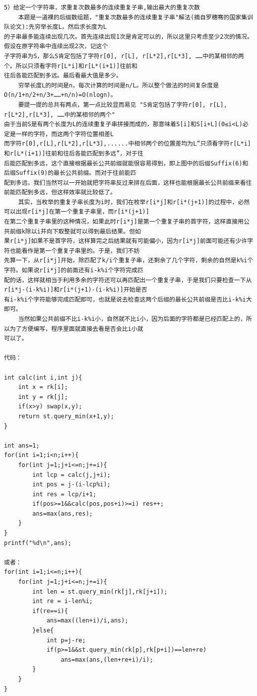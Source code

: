 \documentclass[twoside]{article}
\begin{document}
\begin{lstlisting}
5）给定一个字符串，求重复次数最多的连续重复子串,输出最大的重复次数
    本题是一道裸的后缀数组题，"重复次数最多的连续重复子串"解法(摘自罗穗骞的国家集训队论文):先穷举长度L，然后求长度为L
的子串最多能连续出现几次。首先连续出现1次是肯定可以的，所以这里只考虑至少2次的情况。假设在原字符串中连续出现2次，记这个
子字符串为S，那么S肯定包括了字符r[0], r[L], r[L*2],r[L*3], ……中的某相邻的两个。所以只须看字符r[L*i]和r[L*(i+1)]往前和
往后各能匹配到多远。最后看最大值是多少。
    穷举长度L的时间是n，每次计算的时间是n/L。所以整个做法的时间复杂度是O(n/1+n/2+n/3+……+n/n)=O(nlogn)。
    要提一提的总共有两点，第一点比较显而易见 "S肯定包括了字符r[0], r[L], r[L*2],r[L*3], ……中的某相邻的两个"
由于当前S是有两个长度为L的连续重复子串拼接而成的，那意味着S[i]和S[i+L](0≤i<L)必定是一样的字符，而这两个字符位置相差L
而字符r[0],r[L],r[L*2],r[L*3],......中相邻两个的位置差均为L“只须看字符r[L*i]和r[L*(i+1)]往前和往后各能匹配到多远”，对于往
后能匹配到多远，这个直接根据最长公共前缀就能很容易得到，即上图中的后缀Suffix(6)和后缀Suffix(9)的最长公共前缀。而对于往前能匹
配到多远，我们当然可以一开始就把字符串反过来拼在后面，这样也能根据最长公共前缀来看往前能匹配到多远，但这样效率就比较低了。
    其实，当枚举的重复子串长度为i时，我们在枚举r[i*j]和r[i*(j+1)]的过程中，必然可以出现r[i*j]在第一个重复子串里，而r[i*(j+1)]
在第二个重复子串里的这种情况，如果此时r[i*j]是第一个重复子串的首字符，这样直接用公共前缀k除以i并向下取整就可以得到最后结果。但如
果r[i*j]如果不是首字符，这样算完之后结果就有可能偏小，因为r[i*j]前面可能还有少许字符也能看作是第一个重复子串里的。于是，我们不妨
先算一下，从r[i*j]开始，除匹配了k/i个重复子串，还剩余了几个字符，剩余的自然是k%i个字符。如果说r[i*j]的前面还有i-k%i个字符完成匹
配的话，这样就相当于利用多余的字符还可以再匹配出一个重复子串，于是我们只要检查一下从r[i*j-(i-k%i)]和r[i*(j+1)-(i-k%i)]开始是否
有i-k%i个字符能够完成匹配即可，也就是说去检查这两个后缀的最长公共前缀是否比i-k%i大即可。
    当然如果公共前缀不比i-k%i小，自然就不比i小，因为后面的字符都是已经匹配上的，所以为了方便编写，程序里面就直接去看是否会比i小就
可以了。

代码：

int calc(int i,int j){
    int x = rk[i];
    int y = rk[j];
    if(x>y) swap(x,y);
    return st.query_min(x+1,y);
}

int ans=1;
for(int i=1;i<n;i++){
    for(int j=1;j+i<=n;j+=i){
        int lcp = calc(j,j+i);
        int pos = j-(i-lcp%i);
        int res = lcp/i+1;
        if(pos>=1&&calc(pos,pos+i)>=i) res++;
        ans=max(ans,res);
    }
}
printf("%d\n",ans);

或者：
for(int i=1;i<=n;i++){
    for(int j=1;j+i<=n;j+=i){
        int len = st.query_min(rk[j],rk[j+i]);
        int re = i-len%i;
        if(re==i){
            ans=max((len+i)/i,ans);
        }else{
            int p=j-re;
            if(p>=1&&st.query_min(rk[p],rk[p+i])==len+re)
                ans=max(ans,(len+re+i)/i);
        }
    }
}


\end{lstlisting}
\end{document}
